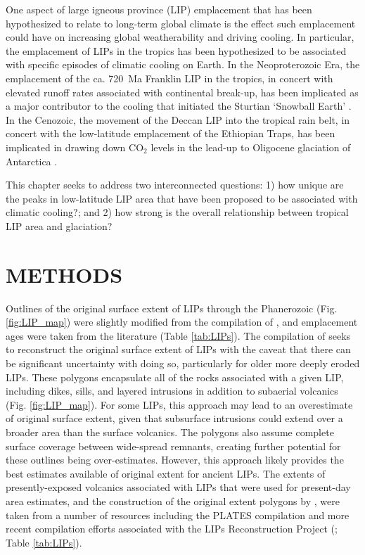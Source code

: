 \documentclass[11pt,letterpaper]{article}
\begin{document}
One aspect of large igneous province (LIP) emplacement that has been hypothesized to relate to long-term global climate is the effect such emplacement could have on increasing global weatherability and driving cooling. In particular, the emplacement of LIPs in the tropics has been hypothesized to be associated with specific episodes of climatic cooling on Earth. In the Neoproterozoic Era, the emplacement of the ca. 720~Ma Franklin LIP in the tropics, in concert with elevated runoff rates associated with continental break-up, has been implicated as a major contributor to the cooling that initiated the Sturtian `Snowball Earth' \citep{Donnadieu2004b, Macdonald2010a, Cox2016a}. In the Cenozoic, the movement of the Deccan LIP into the tropical rain belt, in concert with the low-latitude emplacement of the Ethiopian Traps, has been implicated in drawing down CO$_2$ levels in the lead-up to Oligocene glaciation of Antarctica \citep{Kent2008a, Kent2013a}.

This chapter seeks to address two interconnected questions: 1) how unique are the peaks in low-latitude LIP area that have been proposed to be associated with climatic cooling?; and 2) how strong is the overall relationship between tropical LIP area and glaciation?

\section*{METHODS}

Outlines of the original surface extent of LIPs through the Phanerozoic (Fig. \ref{fig:LIP_map}) were slightly modified from the compilation of \citet{Ernst2017a}, and emplacement ages were taken from the literature (Table \ref{tab:LIPs}). The compilation of \citet{Ernst2017a} seeks to reconstruct the original surface extent of LIPs with the caveat that there can be significant uncertainty with doing so, particularly for older more deeply eroded LIPs. These polygons encapsulate all of the rocks associated with a given LIP, including dikes, sills, and layered intrusions in addition to subaerial volcanics (Fig. \ref{fig:LIP_map}). For some LIPs, this approach may lead to an overestimate of original surface extent, given that subsurface intrusions could extend over a broader area than the surface volcanics. The polygons also assume complete surface coverage between wide-spread remnants, creating further potential for these outlines being over-estimates. However, this approach likely provides the best estimates available of original extent for ancient LIPs. The extents of presently-exposed volcanics associated with LIPs that were used for present-day area estimates, and the construction of the original extent polygons by \citet{Ernst2017a}, were taken from a number of resources including the PLATES compilation \citep{Coffin2006a} and more recent compilation efforts associated with the LIPs Reconstruction Project (\citealp{Ernst2013a}; Table \ref{tab:LIPs}).
\end{document}
